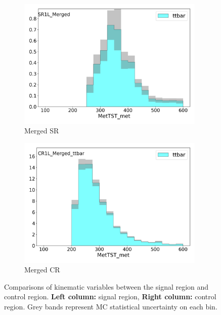  \begin{figure}[htbp]
   \centering
    \begin{subfigure}{0.49\textwidth}
    \includegraphics[width = 0.98\textwidth]{Figures/4/CRSR/SR1L_Merged/MetTST_met.png}
    \caption{Merged SR \met}
    \end{subfigure}
    \begin{subfigure}{0.49\textwidth}
    \includegraphics[width = 0.98\textwidth]{Figures/4/CRSR/CR1L_Merged_ttbar/MetTST_met.png}
    \caption{Merged CR \met}
    \end{subfigure}


     \caption{Comparisons of kinematic variables between the \merged signal region and \ttbar control region. \textbf{Left column:} signal region, \textbf{Right column:} control region. Grey bands represent MC statistical uncertainty on each bin.}
     \label{fig:CRSR_merged}
  \end{figure}

